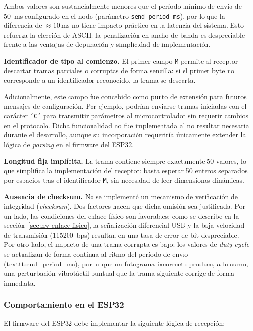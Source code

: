 Ambos valores son sustancialmente menores que el período mínimo de envío
de 50~ms configurado en el nodo (parámetro \texttt{send\_period\_ms}), por
lo que la diferencia de $\approx 10\,\mathrm{ms}$ no tiene impacto práctico
en la latencia del sistema. Esto refuerza la elección de ASCII: la penalización
en ancho de banda es despreciable frente a las ventajas de depuración y
simplicidad de implementación.

\textbf{Identificador de tipo al comienzo.}
El primer campo \texttt{M} permite al receptor descartar tramas parciales o
corruptas de forma sencilla: si el primer byte no corresponde a un identificador
reconocido, la trama se descarta.

Adicionalmente, este campo fue concebido como punto de extensión para futuros
mensajes de configuración. Por ejemplo, podrían enviarse tramas iniciadas con
el carácter \texttt{`C'} para transmitir parámetros al microcontrolador sin
requerir cambios en el protocolo. Dicha funcionalidad no fue implementada al
no resultar necesaria durante el desarrollo, aunque su incorporación requeriría
únicamente extender la lógica de \emph{parsing} en el firmware del ESP32.

\textbf{Longitud fija implícita.}
La trama contiene siempre exactamente 50 valores, lo que simplifica la
implementación del receptor: basta esperar 50 enteros separados por espacios
tras el identificador \texttt{M}, sin necesidad de leer dimensiones
dinámicas.

\textbf{Ausencia de checksum.}
No se implementó un mecanismo de verificación de integridad (\emph{checksum}).
Dos factores hacen que dicha omisión sea justificada. Por un lado, las
condiciones del enlace físico son favorables: como se describe en la
sección~\ref{sec:hw-enlace-fisico}, la señalización diferencial USB y la
baja velocidad de transmisión (115200~bps) resultan en una tasa de error de
bit despreciable. Por otro lado, el impacto de una trama corrupta es
bajo: los valores de \emph{duty cycle} se actualizan de forma continua al
ritmo del período de envío (texttt{send\_period\_ms}), por lo que un
fotograma incorrecto produce, a lo sumo, una perturbación vibrotáctil
puntual que la trama siguiente corrige de forma inmediata.

\subsubsection{Comportamiento en el ESP32}

El firmware del ESP32 debe implementar la siguiente lógica de recepción:

